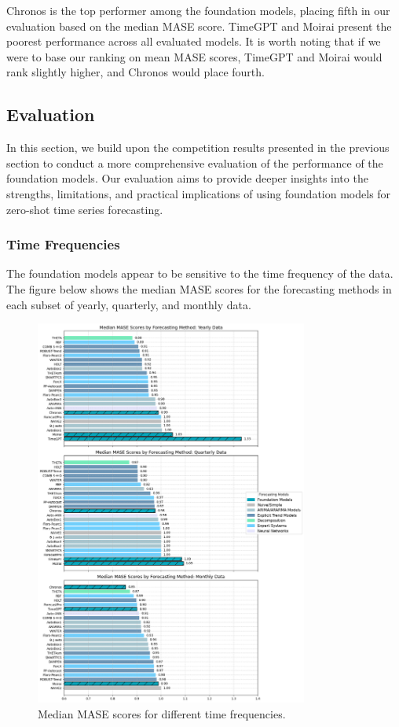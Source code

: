 \documentclass[12pt,a4paper]{article}
\begin{document}
Chronos is the top performer among the foundation models, placing fifth in our evaluation based on the median MASE score. TimeGPT and Moirai present the poorest performance across all evaluated models. It is worth noting that if we were to base our ranking on mean MASE scores, TimeGPT and Moirai would rank slightly higher, and Chronos would place fourth.

\subsection{Evaluation}

In this section, we build upon the competition results presented in the previous section to conduct a more comprehensive evaluation of the performance of the foundation models. Our evaluation aims to provide deeper insights into the strengths, limitations, and practical implications of using foundation models for zero-shot time series forecasting. 

\subsubsection{Time Frequencies}


The foundation models appear to be sensitive to the time frequency of the data. The figure below shows the median MASE scores for the forecasting methods in each subset of yearly, quarterly, and monthly data. 

\begin{figure}[htbp]
  \centering
  \includegraphics[width=0.8\textwidth]{mase_combined.png}
  \caption{Median MASE scores for different time frequencies.}
  \label{mase_combined_figure}
\end{figure}
\end{document}
